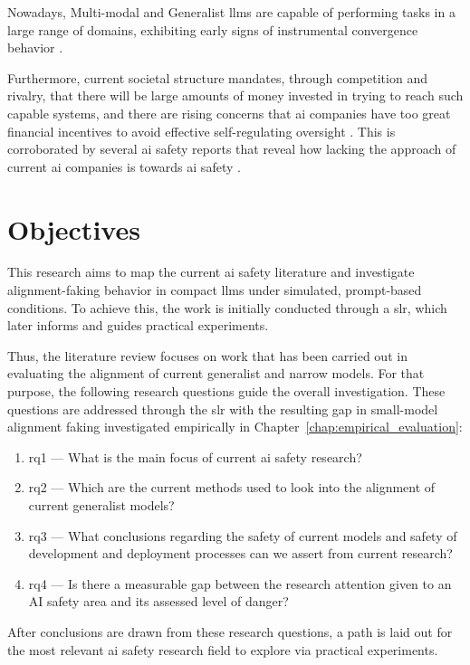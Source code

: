 	Nowadays, Multi-modal and Generalist \glspl{llm} are capable of performing tasks in a large range of domains, exhibiting early signs of instrumental convergence behavior \cite{greenblatt_alignment_faking}.

	Furthermore, current societal structure mandates, through competition and rivalry, that there will be large amounts of money invested in trying to reach such capable systems, and there are rising concerns that \gls{ai} companies have too great financial incentives to avoid effective self-regulating oversight \cite{hemphill_advanced_2025}. This is corroborated by several \gls{ai} safety reports that reveal how lacking the approach of current \gls{ai} companies is towards \gls{ai} safety \cite{FLIAISafetyIndex2025, AISafetyReport2025, FLIAISafetyIndex2026}.

	\section{Objectives}\label{sec:objectives}

	

	This research aims to map the current \gls{ai} safety literature and investigate alignment-faking behavior in compact \glspl{llm} under simulated, prompt-based conditions. To achieve this, the work is initially conducted through a \gls{slr}, which later informs and guides practical experiments.

	
	
	Thus, the literature review focuses on work that has been carried out in evaluating the alignment of current generalist and narrow models. For that purpose, the following research questions guide the overall investigation. These questions are addressed through the \gls{slr} with the resulting gap in small-model alignment faking investigated empirically in Chapter~\ref{chap:empirical_evaluation}:

	\begin{enumerate}
		\item \gls{rq}1 --- What is the main focus of current \gls{ai} safety research?
		\item \gls{rq}2 --- Which are the current methods used to look into the alignment of current generalist models?
		\item \gls{rq}3 --- What conclusions regarding the safety of current models and safety of development and deployment processes can we assert from current research?
		\item \gls{rq}4 --- Is there a measurable gap between the research attention given to an AI safety area and its assessed level of danger?
	\end{enumerate}

	After conclusions are drawn from these research questions, a path is laid out for the most relevant \gls{ai} safety research field to explore via practical experiments.




\newpage